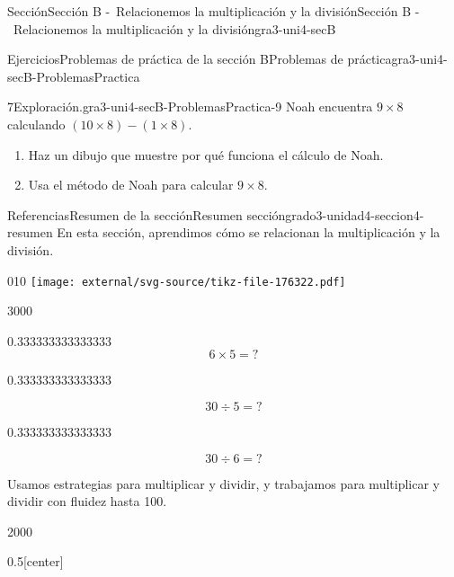 \documentclass[twoside,14pt,]{extarticle}
\begin{document}
\begin{sectionptx}{Sección}{Sección B -~Relacionemos la multiplicación y la división}{}{Sección B -~Relacionemos la multiplicación y la división}{}{}{gra3-uni4-secB}
\begin{exercises-subsection}{Ejercicios}{Problemas de práctica de la sección B}{}{Problemas de práctica}{}{}{gra3-uni4-secB-ProblemasPractica}
\begin{divisionexercise}{7}{Exploración.}{}{gra3-uni4-secB-ProblemasPractica-9}%
Noah encuentra \(9 \times 8\) calculando \((10 \times 8) - (1 \times 8)\).%
%
\begin{enumerate}[label=(\alph*)]
\item{}Haz un dibujo que muestre por qué funciona el cálculo de Noah.%
\item{}Usa el método de Noah para calcular \(9\times 8\).%
\end{enumerate}
\end{divisionexercise}%
\end{exercises-subsection}
%
%
\typeout{************************************************}
\typeout{************************************************}
%
\begin{references-subsection}{Referencias}{Resumen de la sección}{}{Resumen sección}{}{}{grado3-unidad4-seccion4-resumen}
En esta sección, aprendimos cómo se relacionan la multiplicación y la división.%
\begin{image}{0}{1}{0}{}%
\texttt{[image: external/svg-source/tikz-file-176322.pdf]}
\end{image}%
\begin{sidebyside}{3}{0}{0}{0}%
\begin{sbspanel}{0.333333333333333}%
%
\begin{equation*}
6\times 5={?}
\end{equation*}
%
\end{sbspanel}%
\begin{sbspanel}{0.333333333333333}%
\par
%
\begin{equation*}
30\div 5={?}
\end{equation*}
%
\end{sbspanel}%
\begin{sbspanel}{0.333333333333333}%
\par
%
\begin{equation*}
30\div 6={?}
\end{equation*}
%
\end{sbspanel}%
\end{sidebyside}%
\par
Usamos estrategias para multiplicar y dividir, y trabajamos para multiplicar y dividir con fluidez hasta 100.%
\begin{sidebyside}{2}{0}{0}{0}%
\begin{sbspanel}{0.5}[center]%

\end{sbspanel}
\end{sidebyside}
\end{references-subsection}
\end{sectionptx}
\end{document}
